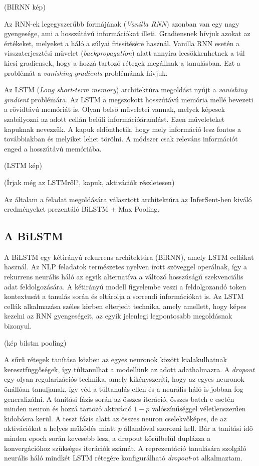 (BIRNN kép)

Az RNN-ek legegyszerűbb formájának (\textit{Vanilla RNN}) azonban van egy nagy gyengesége, ami a hosszútávú információkat illeti. Gradiensnek hívjuk azokat az értékeket, melyeket a háló a súlyai frissítésére használ. Vanilla RNN esetén a visszaterjesztési művelet (\textit{backpropagation}) alatt annyira lecsökkenhetnek a túl kicsi gradiensek, hogy a hozzá tartozó rétegek megállnak a tanulásban. Ezt a problémát a \textit{vanishing gradients} problémának hívjuk.

Az LSTM (\textit{Long short-term memory}) architektúra megoldást nyújt a \textit{vanishing gradient} problémára. Az LSTM a megszokott hosszútávú memória mellé bevezeti a rövidtávú memóriát is. Olyan belső műveletei vannak, melyek képesek szabályozni az adott cellán belüli információáramlást. Ezen műveleteket kapuknak nevezzük. A kapuk eldönthetik, hogy mely információ lesz fontos a továbbiakban és melyiket lehet törölni. A módszer csak releváns információt enged a hosszútávú memóriába.

(LSTM kép)

(Írjak még az LSTMről?, kapuk, aktivációk részletesen)

Az általam a feladat megoldására választott architektúra az InferSent-ben kiváló eredményeket prezentáló BiLSTM + Max Pooling.

\subsection{A BiLSTM}
A BiLSTM egy kétirányú rekurrens architektúra (BiRNN), amely LSTM cellákat használ. Az NLP feladatok természetes nyelven írott szöveggel operálnak, így a rekurrens neurális háló az egyik alternatíva a változó hosszúságú szekvenciális adat feldolgozására. A kétirányú modell figyelembe veszi a feldolgozandó token kontextusát a tanulás során és eltárolja a sorrendi információkat is. Az LSTM cellák alkalmazása széles körben elterjedt technika, amely amellett, hogy képes kezelni az RNN gyengeségeit, az egyik jelenlegi legpontosabb megoldásnak bizonyul.

(kép bilstm pooling)

A sűrű rétegek tanítása közben az egyes neuronok között kialakulhatnak keresztfüggőségek, így túltanulhat a modellünk az adott adathalmazra. A \textit{dropout} egy olyan regularizációs technika, amely kikényszeríti, hogy az egyes neuronok önállóan tanuljanak, így véd a túltanulás ellen és a neurális háló is jobban fog generalizálni. A tanítási fázis során az összes iteráció, összes batch-e esetén minden neuron és hozzá tartozó aktiváció $1-p$ valószínűséggel véletlenszerűen kidobásra kerül. A teszt fázis alatt az összes neuron cselekvőképes, de az aktivációkat a helyes működés miatt $p$ állandóval szorozni kell. Bár a tanítási idő minden epoch során kevesebb lesz, a dropout körülbelül duplázza a konvergációhoz szükséges iterációk számát. A reprezentáció tanulására szolgáló neurális háló mindkét LSTM rétegére konfigurálható \textit{dropout}-ot alkalmaztam.

